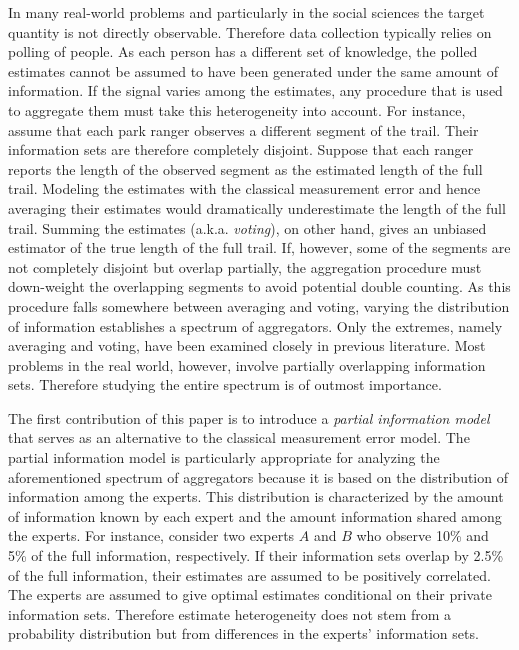 \documentclass[11pt,twoside]{article}
\begin{document}
In many real-world problems and particularly in the social sciences the target quantity is not directly observable. Therefore data collection typically relies on polling of people. As each person has a different set of knowledge, the polled estimates cannot be assumed to have been generated under the same amount of information. If the signal varies among the estimates, any procedure that is used to aggregate them must take this heterogeneity into account. For instance, assume that each park ranger observes a different segment of the trail. Their information sets are therefore completely disjoint. Suppose that each ranger reports the length of the observed segment as the estimated length of the full trail. Modeling the estimates with the classical measurement error and hence averaging their estimates would dramatically underestimate the length of the full trail. Summing the estimates (a.k.a. \textit{voting}), on other hand, gives an unbiased estimator of the true length of the full trail. If, however, some of the segments are not completely disjoint but overlap partially, the aggregation procedure must down-weight the overlapping segments to avoid potential double counting. As this procedure falls somewhere between averaging and voting, varying the distribution of information establishes a spectrum of aggregators. Only the extremes, namely averaging and voting, have been examined closely in previous literature. Most problems in the real world, however, involve partially overlapping information sets. Therefore studying the entire spectrum is of outmost importance. 



The first contribution of this paper is to introduce a \textit{partial information model} that serves as an alternative to the classical measurement error model. The partial information model is particularly appropriate for analyzing the aforementioned spectrum of aggregators because it is based on the distribution of information among the experts. This distribution is characterized by the amount of information known by each expert and the amount information shared among the experts. For instance, consider two experts $A$ and $B$ who observe 10\% and 5\%  of the full information, respectively. If their information sets overlap by 2.5\% of the full information, their estimates are assumed to be positively correlated. The experts are assumed to give optimal estimates conditional on their private information sets. Therefore estimate heterogeneity does not stem from a probability distribution but  from differences in the experts' information sets. 
\end{document}
